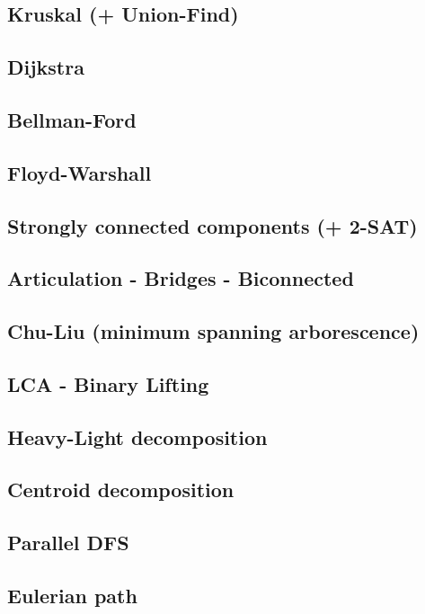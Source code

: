 \subsection{Kruskal (+ Union-Find)}
\subsection{Dijkstra}
\subsection{Bellman-Ford}
\subsection{Floyd-Warshall}
\subsection{Strongly connected components (+ 2-SAT)}
\subsection{Articulation - Bridges - Biconnected}
\subsection{Chu-Liu (minimum spanning arborescence)}
\subsection{LCA - Binary Lifting}
\subsection{Heavy-Light decomposition}
\subsection{Centroid decomposition}
\subsection{Parallel DFS}
\subsection{Eulerian path}
